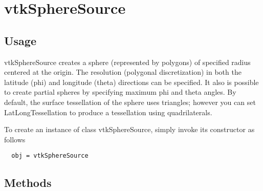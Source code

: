 \section{vtkSphereSource}

\subsection{Usage}

 vtkSphereSource creates a sphere (represented by polygons) of specified
 radius centered at the origin. The resolution (polygonal discretization)
 in both the latitude (phi) and longitude (theta) directions can be
 specified. It also is possible to create partial spheres by specifying
 maximum phi and theta angles. By default, the surface tessellation of
 the sphere uses triangles; however you can set LatLongTessellation to
 produce a tessellation using quadrilaterals.

To create an instance of class vtkSphereSource, simply
invoke its constructor as follows
\begin{verbatim}
  obj = vtkSphereSource
\end{verbatim}
\subsection{Methods}

